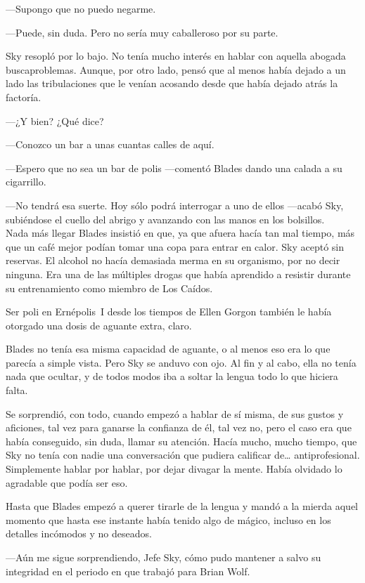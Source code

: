 ---Supongo que no puedo negarme.

---Puede, sin duda. Pero no sería muy caballeroso por su parte.

Sky resopló por lo bajo. No tenía mucho interés en hablar con aquella abogada buscaproblemas. Aunque, por otro lado, pensó que al menos había dejado a un lado las tribulaciones que le venían acosando desde que había dejado atrás la factoría.

---¿Y bien? ¿Qué dice?

---Conozco un bar a unas cuantas calles de aquí.

---Espero que no sea un bar de polis ---comentó Blades dando una calada a su cigarrillo.

---No tendrá esa suerte. Hoy sólo podrá interrogar a uno de ellos ---acabó Sky, subiéndose el cuello del abrigo y avanzando con las manos en los bolsillos.\\

\noindent{}Nada más llegar Blades insistió en que, ya que afuera hacía tan mal tiempo, más que un café mejor podían tomar una copa para entrar en calor. Sky aceptó sin reservas. El alcohol no hacía demasiada merma en su organismo, por no decir ninguna. Era una de las múltiples drogas que había aprendido a resistir durante su entrenamiento como miembro de Los Caídos.

Ser poli en Ernépolis~I desde los tiempos de Ellen Gorgon también le había otorgado una dosis de aguante extra, claro.

Blades no tenía esa misma capacidad de aguante, o al menos eso era lo que parecía a simple vista. Pero Sky se anduvo con ojo. Al fin y al cabo, ella no tenía nada que ocultar, y de todos modos iba a soltar la lengua todo lo que hiciera falta.

Se sorprendió, con todo, cuando empezó a hablar de sí misma, de sus gustos y aficiones, tal vez para ganarse la confianza de él, tal vez no, pero el caso era que había conseguido, sin duda, llamar su atención. Hacía mucho, mucho tiempo, que Sky no tenía con nadie una conversación que pudiera calificar de\dots{} antiprofesional. Simplemente hablar por hablar, por dejar divagar la mente. Había olvidado lo agradable que podía ser eso.

Hasta que Blades empezó a querer tirarle de la lengua y mandó a la mierda aquel momento que hasta ese instante había tenido algo de mágico, incluso en los detalles incómodos y no deseados.

---Aún me sigue sorprendiendo, Jefe Sky, cómo pudo mantener a salvo su integridad en el periodo en que trabajó para Brian Wolf.

